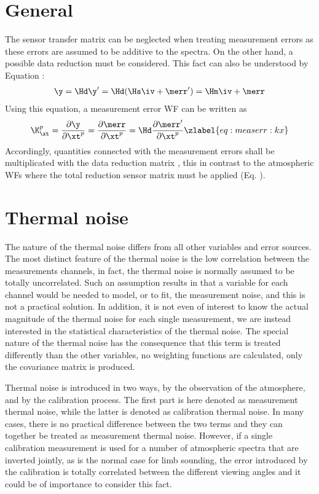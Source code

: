 \section{General}
 
 The sensor transfer matrix can be neglected when treating measurement
 errors as these errors are assumed to be additive to the spectra. On
 the other hand, a possible data reduction must be considered. This
 fact can also be understood by Equation :
 \begin{eqnarray}
   \y = \Hd \y' = \Hd (\Hs \iv + \merr') = \Hm \iv + \merr \nonumber
 \end{eqnarray}
 Using this equation, a measurement error WF can be
 written as
 \begin{equation}
    \K_{\xt}^p = \frac{\partial \y}{\partial \xt^p} 
               = \frac{\partial \merr}{\partial \xt^p}
               =  \Hd \frac{\partial \merr'}{\partial \xt^p}
  \zlabel{eq:measerr:kx}
 \end{equation}
 Accordingly, quantities connected with the measurement errors shall be
 multiplicated with the data reduction matrix \Hd, this in contrast to
 the atmospheric WFs where the total reduction sensor matrix must be applied
 (Eq. ).



\section{Thermal noise}
 
 The nature of the thermal noise differs from all other variables and
 error sources. The most distinct feature of the thermal noise is the
 low correlation between the measurements channels, in fact, the
 thermal noise is normally assumed to be totally uncorrelated. Such an
 assumption results in that a variable for each channel would be
 needed to model, or to fit, the measurement noise, and this is not a
 practical solution. In addition, it is not even of interest to know
 the actual magnitude of the thermal noise for each single
 measurement, we are instead interested in the statistical
 characteristics of the thermal noise.  The special nature of the
 thermal noise has the consequence that this term is treated
 differently than the other variables, no weighting
 functions are calculated, only the covariance matrix is produced.
 
 Thermal noise is introduced in two ways, by the observation of the
 atmosphere, and by the calibration process. The first part is here
 denoted as measurement thermal noise, while the latter is denoted as
 calibration thermal noise. In many cases, there is no practical
 difference between the two terms and they can together be treated as
 measurement thermal noise. However, if a single calibration
 measurement is used for a number of atmospheric spectra that are
 inverted jointly, as is the normal case for limb sounding, the error
 introduced by the calibration is totally correlated between the
 different viewing angles and it could be of importance to consider
 this fact.
 

